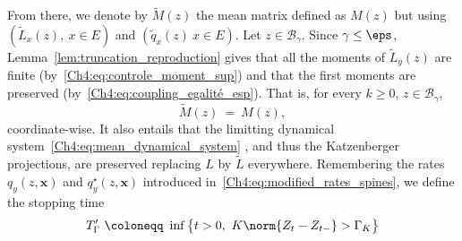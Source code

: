 \begin{refsegment}
From there, we denote by $\widetilde{M}(z)$ the mean matrix defined as $M(z)$ but using $(\widetilde{L}_x(z),\ x\in E)$ and $(\widetilde{q}_x(z)\ x\in E)$.  Let  $z\in \mathscr{B}_\gamma$.
Since $\gamma\leq\eps$, Lemma~\ref{lem:truncation_reproduction} gives that all the moments of $\widetilde{L}_y(z)$ are finite (by~\eqref{Ch4:eq:controle_moment_sup}) and that the first moments are preserved (by~\eqref{Ch4:eq:coupling_egalité_esp}). That is, for every $k\geq 0$, $z\in \mathscr{B}_\gamma$, 
\begin{equation}\label{Ch4:eq:semigroup_preserved_coupling}
\widetilde{M}(z)\ =\ M(z),
\end{equation}
coordinate-wise. It also entails that the limitting dynamical system~\eqref{Ch4:eq:mean_dynamical_system} , and thus the Katzenberger projections, are preserved replacing $L$ by $\widetilde L$ everywhere. 
Remembering the rates $q_y(z,\bm x)$ and $q^{\star}_y(z,\bm x)$ introduced in~\eqref{Ch4:eq:modified_rates_spines}, 
we define the stopping time
\[
        T'_\Gamma\ \coloneqq\ \inf \big\{t > 0,\  K\norm{Z_t-Z_{t-}} > \Gamma_K\big\}
    \]

\end{refsegment}

